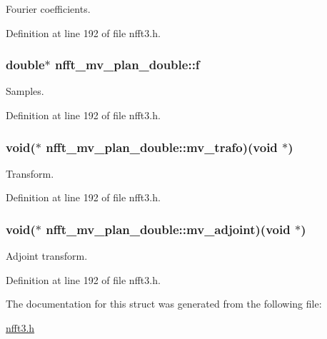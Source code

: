 Fourier coefficients. 



Definition at line 192 of file nfft3.\-h.

\hypertarget{structnfft__mv__plan__double_aa850d9ba71b761a31d3a95aa9581ea5e}{
\subsubsection[{f}]{\setlength{\rightskip}{0pt plus 5cm}double$\ast$ nfft\-\_\-mv\-\_\-plan\-\_\-double\-::f}}\label{structnfft__mv__plan__double_aa850d9ba71b761a31d3a95aa9581ea5e}


Samples. 



Definition at line 192 of file nfft3.\-h.

\hypertarget{structnfft__mv__plan__double_a920771039e5cf889d6a29a243e6922e3}{
\subsubsection[{mv\-\_\-trafo}]{\setlength{\rightskip}{0pt plus 5cm}void($\ast$ nfft\-\_\-mv\-\_\-plan\-\_\-double\-::mv\-\_\-trafo)(void $\ast$)}}\label{structnfft__mv__plan__double_a920771039e5cf889d6a29a243e6922e3}


Transform. 



Definition at line 192 of file nfft3.\-h.

\hypertarget{structnfft__mv__plan__double_a92e4080bcb7241befa250be9d8f9a1cd}{
\subsubsection[{mv\-\_\-adjoint}]{\setlength{\rightskip}{0pt plus 5cm}void($\ast$ nfft\-\_\-mv\-\_\-plan\-\_\-double\-::mv\-\_\-adjoint)(void $\ast$)}}\label{structnfft__mv__plan__double_a92e4080bcb7241befa250be9d8f9a1cd}


Adjoint transform. 



Definition at line 192 of file nfft3.\-h.



The documentation for this struct was generated from the following file\-:\begin{DoxyCompactItemize}
\item 
\hyperlink{nfft3_8h}{nfft3.\-h}\end{DoxyCompactItemize}
